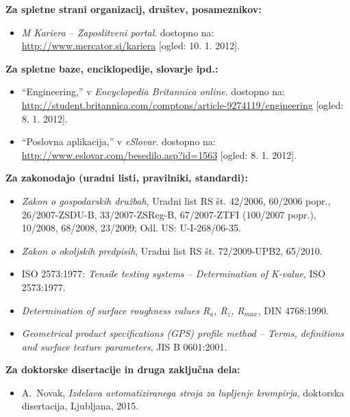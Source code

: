 \textbf{Za spletne strani organizacij, društev, posameznikov:}
\begin{itemize}
\item[{[13]}] \emph{M Kariera – Zaposlitveni portal}. dostopno na:
\url{http://www.mercator.si/kariera} [ogled: 10. 1. 2012].
\end{itemize}

\textbf{Za spletne baze, enciklopedije, slovarje ipd.:}
\begin{itemize}
\item[{[14]}] ``Engineering,'' v \emph{Encyclopedia Britannica online}. 
dostopno na:
\url{http://student.britannica.com/comptons/article-9274119/engineering}
[ogled: 8. 1. 2012].\\

\item[{[15]}] ``Poslovna aplikacija,'' v \emph{eSlovar}. dostopno na:
\url{http://www.eslovar.com/besedilo.asp?id=1563} [ogled: 8. 1. 2012].
\end{itemize}

\textbf{Za zakonodajo (uradni listi, pravilniki, standardi):}
\begin{itemize}
\item[{[16]}] \emph{Zakon o gospodarskih družbah}, {U}radni list RS št. 
42/2006, 60/2006 popr., 26/2007-ZSDU-B, 33/2007-ZSReg-B, 67/2007-ZTFI (100/2007 
popr.), 10/2008, 68/2008, 23/2009; Odl. US: U-I-268/06-35.\\

\item[{[17]}] \emph{Zakon o okoljskih predpisih}, {U}radni list RS št. 
72/2009-UPB2, 65/2010.\\

\item[{[18]}] {ISO 2573:1977}: \emph{Tensile testing systems – Determination of 
K-value}, {ISO 2573:1977}.\\

\item[{[19]}] \emph{Determination of surface roughness values R$_a$, R$_z$, 
R$_{max}$}, {DIN 4768:1990}.\\

\item[{[20]}] \emph{Geometrical product specifications (GPS) profile method – 
Terms, definitions and surface texture parameters}, {JIS B 0601:2001}.
\end{itemize}

\textbf{Za doktorske disertacije in druga zaključna dela:}
\begin{itemize}
\item[{[21]}] A.~Novak, \emph{Izdelava avtomatiziranega stroja za lupljenje 
krompirja}, doktorska disertacija, Ljubljana, 2015.
\end{itemize}

